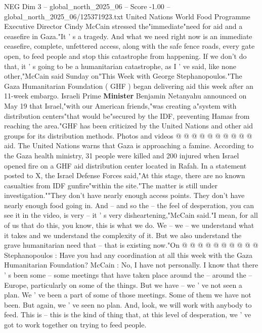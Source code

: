 \begin{textsample}{NEG Dim 3 – global\_north\_2025\_06 – Score -1.00 – global\_north\_2025\_06/125371923.txt}  \label{ex:f3_neg_353}
United Nations World Food Programme Executive Director Cindy McCain stressed the"immediate"need for aid and a ceasefire in Gaza."It ' s a tragedy.
And what we need right now is an immediate ceasefire, complete, unfettered access, along with the safe fence roads, every gate open, to feed people and stop this catastrophe from happening.
If we don't do that, it ' s going to be a humanitarian catastrophe, as I ' ve said, like none other,"McCain said Sunday on"This Week with George Stephanopoulos."The Gaza Humanitarian Foundation ( GHF ) began delivering aid this week after an 11-week embargo.
Israeli Prime \textbf{Minister} Benjamin Netanyahu announced on May 19 that Israel,"with our American friends,"was creating a"system with distribution centers"that would be"secured by the IDF, preventing Hamas from reaching the area."GHF has been criticized by the United Nations and other aid groups for its distribution methods.
Photos and videos @ @ @ @ @ @ @ @ @ @ aid.
The United Nations warns that Gaza is approaching a famine.
According to the Gaza health ministry, 31 people were killed and 200 injured when Israel opened fire on a GHF aid distribution center located in Rafah.
In a statement posted to X, the Israel Defense Forces said,"At this stage, there are no known casualties from IDF gunfire"within the site."The matter is still under investigation.""They don't have nearly enough access points.
They don't have nearly enough food going in.
And -- and so the -- the feel of desperation, you can see it in the video, is very -- it ' s very disheartening,"McCain said."I mean, for all of us that do this, you know, this is what we do.
We -- we -- we understand what it takes and we understand the complexity of it.
But we also understand the grave humanitarian need that -- that is existing now."On @ @ @ @ @ @ @ @ @ @ Stephanopoulos : Have you had any coordination at all this week with the Gaza Humanitarian Foundation?
McCain : No, I have not personally.
I know that there ' s been some -- some meetings that have taken place around the -- around the -- Europe, particularly on some of the things.
But we have -- we ' ve not seen a plan.
We ' ve been a part of some of those meetings.
Some of them we have not been.
But again, we ' ve seen no plan.
And, look, we will work with anybody to feed.
This is -- this is the kind of thing that, at this level of desperation, we ' ve got to work together on trying to feed people.

\end{textsample}

